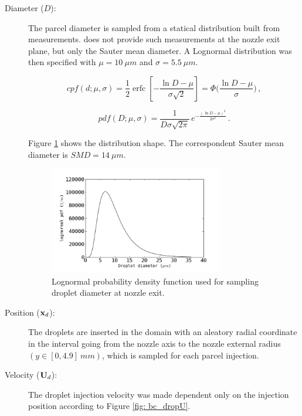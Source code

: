 \begin{description}
  \item[Diameter ($D$):] 
  
The parcel diameter is sampled from a statical distribution built from measurements. \cite{chen} does not provide such measurements at the nozzle exit plane, but only the Sauter mean diameter.  A Lognormal distribution was then specified with $\mu = 10\ \mu m$ and $\sigma=5.5\ \mu m$.

\begin{equation}
 cpf(d; \mu, \sigma) = \frac12 \operatorname{erfc}\!\left[-\frac{\ln D - \mu}{\sigma\sqrt{2}}\right] = \Phi\bigg(\frac{\ln D - \mu}{\sigma}\bigg) \, ,
\end{equation}

\begin{equation}
 pdf(D;\mu,\sigma) = \frac{1}{D \sigma \sqrt{2 \pi}}\, e^{-\frac{(\ln D - \mu)^2}{2\sigma^2}} \, .
\end{equation}

Figure \ref{fig: lognormal} shows the distribution shape. The correspondent Sauter mean diameter is $SMD =14\ \mu m$.
\begin{figure}[!htb]
\centering
  \includegraphics[width=0.75\textwidth]{./figuras/chap3/lognormal.png}
\caption{Lognormal probability density function used for sampling droplet diameter at nozzle exit.}
\label{fig: lognormal}
\end{figure} 
  
\item[Position ($\mathbf{x}_d$):]
The droplets are inserted in the domain with an aleatory radial coordinate in the interval going from the nozzle axis to the nozzle external radius $(y \in [0, 4.9] \ mm )$, which is sampled for each parcel injection. 
  
  
  \item[Velocity ($\mathbf{U}_d$):]
  The droplet injection velocity was made dependent only on the injection position according to Figure \ref{fig: bc_dropU}.
  

\end{description}
